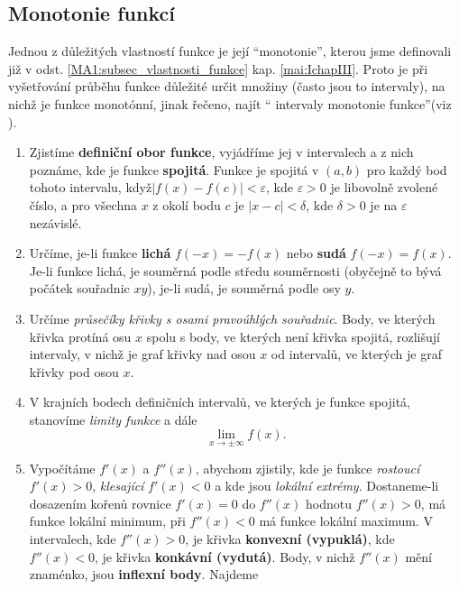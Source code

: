     \subsection{Monotonie funkcí}
      Jednou z důležitých vlastností funkce je její \textquotedblleft monotonie\textquotedblright, 
      kterou jsme definovali již v odst. \ref{MA1:subsec_vlastnosti_funkce} kap. 
      \ref{mai:IchapIII}. Proto je při vyšetřování průběhu funkce důležité určit množiny (často 
      jsou to intervaly), na nichž je funkce monotónní, jinak řečeno, najít \textquotedblleft 
      intervaly monotonie funkce\textquotedblright (viz \cite[s.~208]{Brabec1989}). 
    \begin{enumerate}
      \item Zjistíme \textbf{definiční obor funkce}, vyjádříme jej v intervalech a z nich poznáme,  
            kde je funkce \textbf{spojitá}. Funkce je spojitá v $(a,b)$ pro každý bod tohoto 
            intervalu, když$|f(x)-f(c)|<\varepsilon$, kde $\varepsilon>0$ je libovolně zvolené 
            číslo, a pro všechna $x$ z okolí bodu $c$ je $|x-c|<\delta$, kde $\delta>0$ je na 
            $\varepsilon$ nezávislé.
      \item Určíme, je-li funkce \textbf{lichá} $f(-x)=-f(x)$ nebo \textbf{sudá} $f(-x)=f(x)$.   
            Je-li funkce lichá, je souměrná podle středu souměrnosti (obyčejně to bývá počátek 
            souřadnic $xy$), je-li sudá, je souměrná podle osy $y$.
      \item Určíme \emph{průsečíky křivky s osami pravoúhlých souřadnic}. Body, ve kte\-rých 
            křivka  protíná osu $x$ spolu s body, ve kte\-rých není křivka spojitá, rozlišují 
            intervaly, v nichž je graf křivky nad osou $x$ od intervalů, ve kterých je graf křivky 
            pod osou $x$.
      \item V krajních bodech definičních intervalů, ve kterých je funkce spojitá, stano\-víme 
      \emph{limity funkce} a dále $$\lim_{x \to \pm \infty}f(x).$$
      \item Vypočítáme $f'(x)$ a $f''(x)$, abychom zjistily, kde je funkce \emph{rostoucí}     
            $f'(x)>0$, \emph{klesající} $f'(x)<0$ a kde jsou \emph{lokální extrémy}. Dostaneme-li 
            dosazením kořenů rovnice $f'(x)=0$ do $f''(x)$ hodnotu $f''(x)>0$, má funkce lokální 
            minimum, při $f''(x)<0$ má funkce lokální maximum. V intervalech, kde $f''(x)>0$, je 
            křivka \textbf{konvexní (vypuklá)}, kde $f''(x)<0$, je křivka \textbf{konkávní 
            (vydutá)}. Body, v nichž $f''(x)$ mění znaménko, jsou \textbf{inflexní body}. Najdeme 

\end{enumerate}
